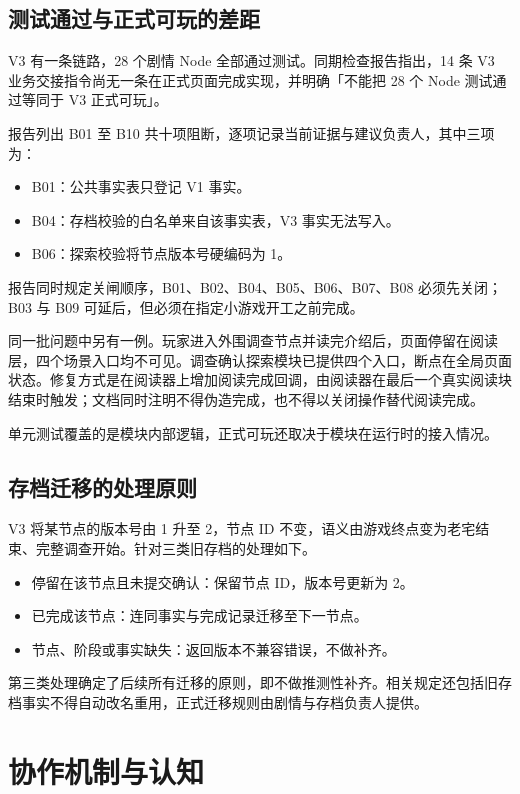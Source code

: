 \subsection{测试通过与正式可玩的差距}

V3 有一条链路，28 个剧情 Node 全部通过测试。同期检查报告指出，14 条 V3 业务交接指令尚无一条在正式页面完成实现，并明确「不能把 28 个 Node 测试通过等同于 V3 正式可玩」。

报告列出 B01 至 B10 共十项阻断，逐项记录当前证据与建议负责人，其中三项为：

\begin{itemize}
  \item B01：公共事实表只登记 V1 事实。
  \item B04：存档校验的白名单来自该事实表，V3 事实无法写入。
  \item B06：探索校验将节点版本号硬编码为 1。
\end{itemize}

报告同时规定关闸顺序，B01、B02、B04、B05、B06、B07、B08 必须先关闭；B03 与 B09 可延后，但必须在指定小游戏开工之前完成。

同一批问题中另有一例。玩家进入外围调查节点并读完介绍后，页面停留在阅读层，四个场景入口均不可见。调查确认探索模块已提供四个入口，断点在全局页面状态。修复方式是在阅读器上增加阅读完成回调，由阅读器在最后一个真实阅读块结束时触发；文档同时注明不得伪造完成，也不得以关闭操作替代阅读完成。

单元测试覆盖的是模块内部逻辑，正式可玩还取决于模块在运行时的接入情况。

\subsection{存档迁移的处理原则}

V3 将某节点的版本号由 1 升至 2，节点 ID 不变，语义由游戏终点变为老宅结束、完整调查开始。针对三类旧存档的处理如下。

\begin{itemize}
  \item 停留在该节点且未提交确认：保留节点 ID，版本号更新为 2。
  \item 已完成该节点：连同事实与完成记录迁移至下一节点。
  \item 节点、阶段或事实缺失：返回版本不兼容错误，不做补齐。
\end{itemize}

第三类处理确定了后续所有迁移的原则，即不做推测性补齐。相关规定还包括旧存档事实不得自动改名重用，正式迁移规则由剧情与存档负责人提供。

\section{协作机制与认知}

